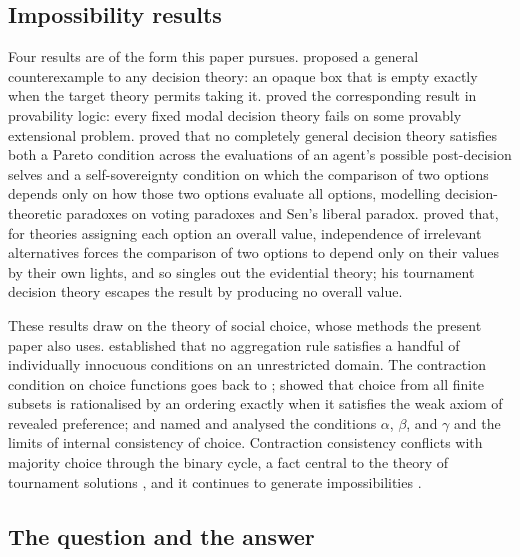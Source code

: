 \subsection{Impossibility results}

Four results are of the form this paper pursues. \textcite{skalse2021} proposed a general
counterexample to any decision theory: an opaque box that is empty exactly when the target theory
permits taking it. \textcite{fallenstein2014evil} proved the corresponding result in provability logic:
every fixed modal decision theory fails on some provably extensional problem. \textcite{briggs2010} proved that no completely general decision theory satisfies
both a Pareto condition across the evaluations of an agent's possible post-decision selves and a
self-sovereignty condition on which the comparison of two options depends only on how those two
options evaluate all options, modelling decision-theoretic paradoxes on voting paradoxes and Sen's
liberal paradox. \textcite{podgorski2022} proved that, for theories assigning each option an overall
value, independence of irrelevant alternatives forces the comparison of two options to depend only
on their values by their own lights, and so singles out the evidential theory; his tournament decision
theory escapes the result by producing no overall value.

These results draw on the theory of social choice, whose methods the present paper also uses.
\textcite{arrow1951} established that no aggregation rule satisfies a handful of individually
innocuous conditions on an unrestricted domain. The contraction condition on choice functions goes
back to \textcite{chernoff1954}; \textcite{arrow1959} showed that choice from all finite subsets is
rationalised by an ordering exactly when it satisfies the weak axiom of revealed preference; and
\textcite{sen1970,sen1971,sen1977,sen1993} named and analysed the conditions $\alpha$, $\beta$, and $\gamma$
and the limits of internal consistency of choice. Contraction consistency conflicts with majority
choice through the binary cycle, a fact central to the theory of tournament solutions
\autocite{moulin1986,laslier1997,brandtharrenstein2011,brandtbrillharrenstein2016}, and it continues to
generate impossibilities \autocite{blairetal1976,basumallikbhattacharya2026}.

\subsection{The question and the answer}

